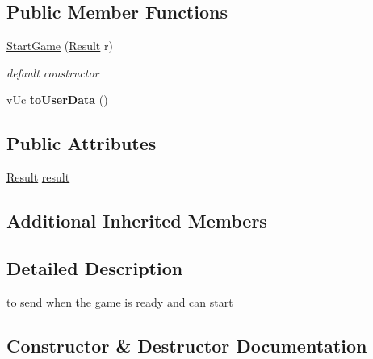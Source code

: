 \subsection*{Public Member Functions}
\begin{DoxyCompactItemize}
\item 
\hyperlink{class_network_1_1_messages_1_1_start_game_a78950cba54c7a901da30f1de63aa4c99}{Start\+Game} (\hyperlink{class_network_1_1_messages_1_1_base_a646d774928c7dfac987228f26ab5d46a}{Result} r)
\begin{DoxyCompactList}\small\item\em default constructor \end{DoxyCompactList}\item 
\mbox{\label{class_network_1_1_messages_1_1_start_game_ae776e82ab8f1fa42f7ca4c70f5e1879a}} 
v\+Uc {\bfseries to\+User\+Data} ()
\end{DoxyCompactItemize}
\subsection*{Public Attributes}
\begin{DoxyCompactItemize}
\item 
\hyperlink{class_network_1_1_messages_1_1_base_a646d774928c7dfac987228f26ab5d46a}{Result} \hyperlink{class_network_1_1_messages_1_1_start_game_a0f8789ffc573d97efb7004ca739fa1e6}{result}
\end{DoxyCompactItemize}
\subsection*{Additional Inherited Members}


\subsection{Detailed Description}
to send when the game is ready and can start 

\subsection{Constructor \& Destructor Documentation}
\mbox{\label{class_network_1_1_messages_1_1_start_game_a78950cba54c7a901da30f1de63aa4c99}} 
